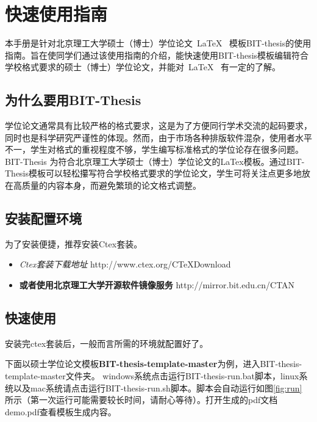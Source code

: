 
\chapter{快速使用指南}
\label{chap:what}

本手册是针对北京理工大学硕士（博士）学位论文~\LaTeX~ 模板BIT-thesis的使用指南。旨在使同学们通过该使用指南的介绍，能快速使用BIT-thesis模板编辑符合学校格式要求的硕士（博士）学位论文，并能对~\LaTeX~ 有一定的了解。

\section{为什么要用BIT-Thesis}
\label{sec:why}
学位论文通常具有比较严格的格式要求，这是为了方便同行学术交流的起码要求，同时也是科学研究严谨性的体现。然而，由于市场各种排版软件混杂，使用者水平不一，学生对格式的重视程度不够，学生编写标准格式的学位论存在很多问题。BIT-Thesis 为符合北京理工大学硕士（博士）学位论文的LaTex模板。通过BIT-Thesis模板可以轻松攥写符合学校格式要求的学位论文，学生可将关注点更多地放在高质量的内容本身，而避免繁琐的论文格式调整。

\section{安装配置环境}
\label{sec:requirements}

为了安装便捷，推荐安装Ctex套装。

\begin{itemize}
\item \textit{Ctex套装下载地址}  http://www.ctex.org/CTeXDownload

\item \textbf{或者使用北京理工大学开源软件镜像服务}  http://mirror.bit.edu.cn/CTAN

\end{itemize}



\section{快速使用}
\label{sec:process}

安装完ctex套装后，一般而言所需的环境就配置好了。

下面以硕士学位论文模板\textbf{BIT-thesis-template-master}为例，进入BIT-thesis-template-master文件夹。
windows系统点击运行BIT-thesis-run.bat脚本，linux系统以及mac系统请点击运行BIT-thesis-run.sh脚本。脚本会自动运行如图\ref{fig:run} 所示（第一次运行可能需要较长时间，请耐心等待）。打开生成的pdf文档demo.pdf查看模板生成内容。
 
